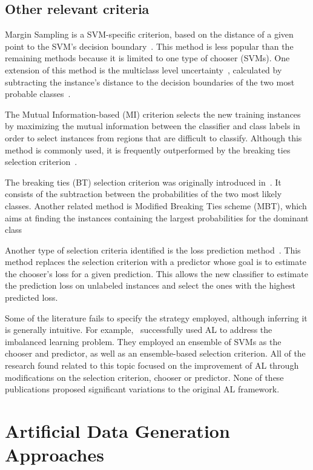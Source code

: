 \documentclass[preprint,12pt]{elsarticle}
\begin{document}
\subsection{Other relevant criteria}

Margin Sampling is a SVM-specific criterion, based on the distance of a given
point to the SVM's decision boundary~\cite{Shrivastava2021}. This method is
less popular than the remaining methods because it is limited to one type of
chooser (SVMs). One extension of this method is the multiclass level
uncertainty~\cite{Shrivastava2021}, calculated by subtracting the instance's
distance to the decision boundaries of the two most probable
classes~\cite{Demir2011}.

The Mutual Information-based (MI) criterion selects the new training instances
by maximizing the mutual information between the classifier and class labels
in order to select instances from regions that are difficult to classify.
Although this method is commonly used, it is frequently outperformed by the
breaking ties selection criterion~\cite{Li2011,Liu2018}.

The breaking ties (BT) selection criterion was originally introduced
in~\cite{Luo2003}. It consists of the subtraction between the probabilities of
the two most likely classes. Another related method is Modified Breaking Ties
scheme (MBT), which aims at finding the instances containing the largest
probabilities for the dominant class~\cite{Liu2018,Li2013a}

Another type of selection criteria identified is the loss prediction
method~\cite{Yoo2019}. This method replaces the selection criterion with a
predictor whose goal is to estimate the chooser's loss for a given
prediction. This allows the new classifier to estimate the prediction loss on
unlabeled instances and select the ones with the highest predicted loss.

Some of the literature fails to specify the strategy employed, although
inferring it is generally intuitive. For example,~\cite{Ertekin2007}
successfully used AL to address the imbalanced learning problem. They employed
an ensemble of SVMs as the chooser and predictor, as well as an ensemble-based
selection criterion. All of the research found related to this topic focused on
the improvement of AL through modifications on the selection criterion, chooser
or predictor. None of these publications proposed significant variations to the
original AL framework.

\section{Artificial Data Generation Approaches}~\label{sec:ovs-sota}
\end{document}
